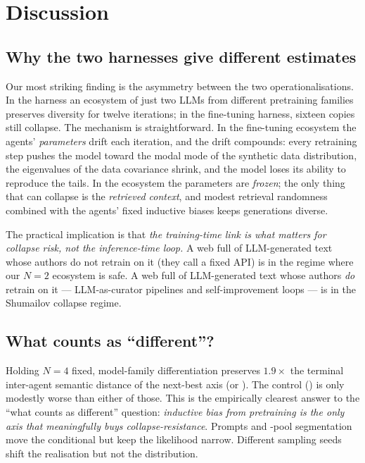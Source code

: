 \section{Discussion}
\label{sec:discussion}

\subsection{Why the two harnesses give different \mvp estimates}

Our most striking finding is the asymmetry between the two
operationalisations. In the \rag harness an ecosystem of just two
LLMs from different pretraining families preserves diversity for
twelve iterations; in the fine-tuning harness, sixteen \distilgpt
copies still collapse. The mechanism is straightforward. In the
fine-tuning ecosystem the agents' \emph{parameters} drift each
iteration, and the drift compounds: every retraining step pushes the
model toward the modal mode of the synthetic data distribution, the
eigenvalues of the data covariance shrink, and the model loses its
ability to reproduce the tails. In the \rag ecosystem the parameters
are \emph{frozen}; the only thing that can collapse is the
\emph{retrieved context}, and modest retrieval randomness combined with
the agents' fixed inductive biases keeps generations diverse.

The practical implication is that \emph{the training-time link is what
matters for collapse risk, not the inference-time loop.} A web full
of LLM-generated text whose authors do not retrain on it (\eg they
call a fixed API) is in the regime where our $N{=}2$ \rag ecosystem
is safe. A web full of LLM-generated text whose authors \emph{do}
retrain on it --- LLM-as-curator pipelines and self-improvement loops
\citep{kovac2025recursive} --- is in the Shumailov collapse regime.

\subsection{What counts as ``different''?}

Holding $N{=}4$ fixed, model-family differentiation preserves
$\mathbf{1.9\times}$ the terminal inter-agent semantic distance of the
next-best axis (\axisprompt or \axisdata). The control (\axisseed) is
only modestly worse than either of those. This is the empirically
clearest answer to the ``what counts as different'' question:
\emph{inductive bias from pretraining is the only axis that
meaningfully buys collapse-resistance}. Prompts and \rag-pool
segmentation move the conditional but keep the likelihood narrow.
Different sampling seeds shift the realisation but not the
distribution.

